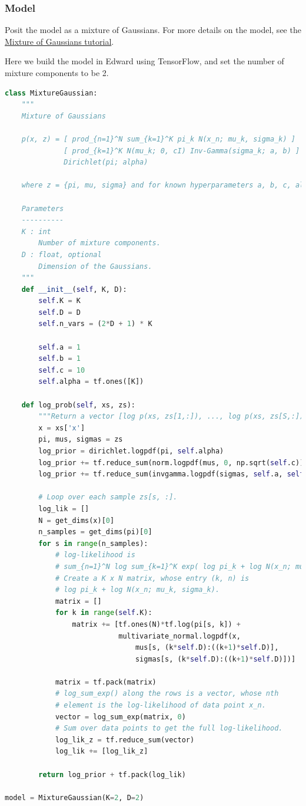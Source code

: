 \subsubsection{Model}

Posit the model as a mixture of Gaussians. For more details on the
model, see the
\href{tut_mixture_gaussian.html}
{Mixture of Gaussians tutorial}.

Here we build the model in Edward using TensorFlow, and set the number
of mixture components to be 2.
\begin{lstlisting}[language=Python]
class MixtureGaussian:
    """
    Mixture of Gaussians

    p(x, z) = [ prod_{n=1}^N sum_{k=1}^K pi_k N(x_n; mu_k, sigma_k) ]
              [ prod_{k=1}^K N(mu_k; 0, cI) Inv-Gamma(sigma_k; a, b) ]
              Dirichlet(pi; alpha)

    where z = {pi, mu, sigma} and for known hyperparameters a, b, c, alpha.

    Parameters
    ----------
    K : int
        Number of mixture components.
    D : float, optional
        Dimension of the Gaussians.
    """
    def __init__(self, K, D):
        self.K = K
        self.D = D
        self.n_vars = (2*D + 1) * K

        self.a = 1
        self.b = 1
        self.c = 10
        self.alpha = tf.ones([K])

    def log_prob(self, xs, zs):
        """Return a vector [log p(xs, zs[1,:]), ..., log p(xs, zs[S,:])]."""
        x = xs['x']
        pi, mus, sigmas = zs
        log_prior = dirichlet.logpdf(pi, self.alpha)
        log_prior += tf.reduce_sum(norm.logpdf(mus, 0, np.sqrt(self.c)), 1)
        log_prior += tf.reduce_sum(invgamma.logpdf(sigmas, self.a, self.b), 1)

        # Loop over each sample zs[s, :].
        log_lik = []
        N = get_dims(x)[0]
        n_samples = get_dims(pi)[0]
        for s in range(n_samples):
            # log-likelihood is
            # sum_{n=1}^N log sum_{k=1}^K exp( log pi_k + log N(x_n; mu_k, sigma_k) )
            # Create a K x N matrix, whose entry (k, n) is
            # log pi_k + log N(x_n; mu_k, sigma_k).
            matrix = []
            for k in range(self.K):
                matrix += [tf.ones(N)*tf.log(pi[s, k]) +
                           multivariate_normal.logpdf(x,
                               mus[s, (k*self.D):((k+1)*self.D)],
                               sigmas[s, (k*self.D):((k+1)*self.D)])]

            matrix = tf.pack(matrix)
            # log_sum_exp() along the rows is a vector, whose nth
            # element is the log-likelihood of data point x_n.
            vector = log_sum_exp(matrix, 0)
            # Sum over data points to get the full log-likelihood.
            log_lik_z = tf.reduce_sum(vector)
            log_lik += [log_lik_z]

        return log_prior + tf.pack(log_lik)

model = MixtureGaussian(K=2, D=2)
\end{lstlisting}


